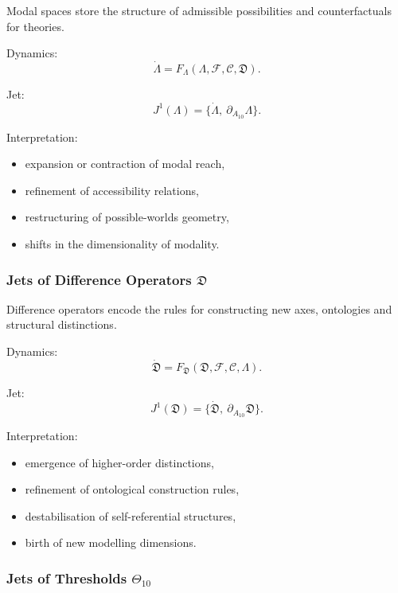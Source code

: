 Modal spaces store the structure of admissible possibilities and
counterfactuals for theories.

Dynamics:
\[
\dot{\Lambda}
=
F_{\Lambda}(\Lambda,\mathcal{F},\mathcal{C},\mathfrak{D}).
\]

Jet:
\[
J^1(\Lambda)=\{\dot{\Lambda},\ \partial_{A_{10}}\Lambda\}.
\]

Interpretation:
\begin{itemize}
    \item expansion or contraction of modal reach,
    \item refinement of accessibility relations,
    \item restructuring of possible-worlds geometry,
    \item shifts in the dimensionality of modality.
\end{itemize}


\subsubsection{Jets of Difference Operators $\mathfrak{D}$}

Difference operators encode the rules for constructing new axes,
ontologies and structural distinctions.

Dynamics:
\[
\dot{\mathfrak{D}}
=
F_{\mathfrak{D}}(\mathfrak{D},\mathcal{F},\mathcal{C},\Lambda).
\]

Jet:
\[
J^1(\mathfrak{D}) =
\{\dot{\mathfrak{D}},\ \partial_{A_{10}}\mathfrak{D}\}.
\]

Interpretation:
\begin{itemize}
    \item emergence of higher-order distinctions,
    \item refinement of ontological construction rules,
    \item destabilisation of self-referential structures,
    \item birth of new modelling dimensions.
\end{itemize}


\subsubsection{Jets of Thresholds $\Theta_{10}$}

